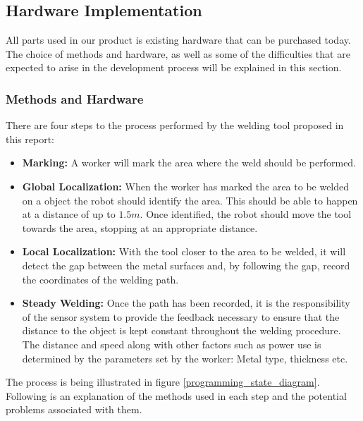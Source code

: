 \subsection{Hardware Implementation}
All parts used in our product is existing hardware that can be purchased today.
The choice of methods and hardware, as well as some of the difficulties that are expected to arise in the development process will be explained in this section.
\subsubsection{Methods and Hardware}
There are four steps to the process performed by the welding tool proposed in this report:
\begin{itemize}
	\item \textbf{Marking:            } A worker will mark the area where the weld should be performed.
	\item \textbf{Global Localization:} When the worker has marked the area to be welded on a object the robot should identify the area. This should be able to happen at a distance of up to $1.5m$. Once identified, the robot should move the tool towards the area, stopping at an appropriate distance.
	\item \textbf{Local Localization: } With the tool closer to the area to be welded, it will detect the gap between the metal surfaces and, by following the gap, record the coordinates of the welding path.
	\item \textbf{Steady Welding:     } Once the path has been recorded, it is the responsibility of the sensor system to provide the feedback necessary to ensure that the distance to the object is kept constant throughout the welding procedure. The distance and speed along with other factors such as power use is determined by the parameters set by the worker: Metal type, thickness etc.
\end{itemize}
The process is being illustrated in figure \ref{programming_state_diagram}. Following is an explanation of the methods used in each step and the potential problems associated with them.

